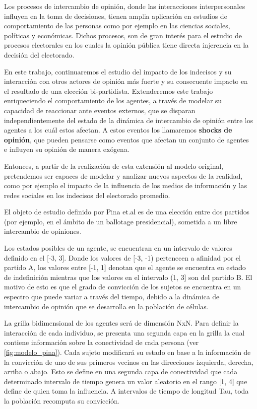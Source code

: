 Los procesos de intercambio de opinión, donde las interacciones interpersonales influyen en la toma de decisiones, tienen amplia aplicación en estudios de comportamiento de las personas como por ejemplo en las ciencias sociales, políticas y económicas. Dichos procesos, son de gran interés para el estudio de procesos electorales en los cuales la opinión pública tiene directa injerencia en la decisión del electorado.

En este trabajo, continuaremos el estudio del impacto de los indecisos y su interacción con otros actores de opinión más fuerte y su consecuente impacto en el resultado de una elección bi-partidista. Extenderemos este trabajo enriqueciendo el comportamiento de los agentes, a través de modelar su capacidad de reaccionar ante eventos externos, que se disparan independientemente del estado de la dinámica de intercambio de opinión entre los agentes a los cuál estos afectan. A estos eventos los llamaremos \textbf{shocks de opinión}, que pueden pensarse como eventos que afectan un conjunto de agentes e influyen su opinión de manera exógena.

Entonces, a partir de la realización de esta extensión al modelo original, pretendemos ser capaces de modelar y analizar nuevos aspectos de la realidad, como por ejemplo el impacto de la influencia de los medios de información y las redes sociales en los indecisos del electorado promedio.

El objeto de estudio definido por Pina et.al es de una elección entre dos partidos (por ejemplo, en el ámbito de un ballotage presidencial), sometida a un libre intercambio de opiniones.

Los estados posibles de un agente, se encuentran en un intervalo de valores definido en el [-3, 3]. Donde los valores de [-3, -1) pertenecen a afinidad por el partido A, los valores entre [-1, 1] denotan que el agente se encuentra en estado de indefinición mientras que los valores en el intervalo (1, 3] son del partido B.
El motivo de esto es que el grado de convicción de los sujetos se encuentra en un espectro que puede variar a través del tiempo, debido a la dinámica de intercambio de opinión que se desarrolla en la población de células.

La grilla bidimensional de los agentes será de dimensión NxN. Para definir la interacción de cada individuo, se presenta una segunda capa en la grilla la cual contiene información sobre la conectividad de cada persona (ver \ref{fig:modelo_pina}). Cada sujeto modificará su estado en base a la información de la convicción de uno de sus primeros vecinos en las direcciones izquierda, derecha, arriba o abajo. Esto se define en una segunda capa de conectividad que cada determinado intervalo de tiempo genera un valor aleatorio en el rango [1, 4] que define de quien toma la influencia. A intervalos de tiempo de longitud Tau, toda la población recomputa su convicción.

